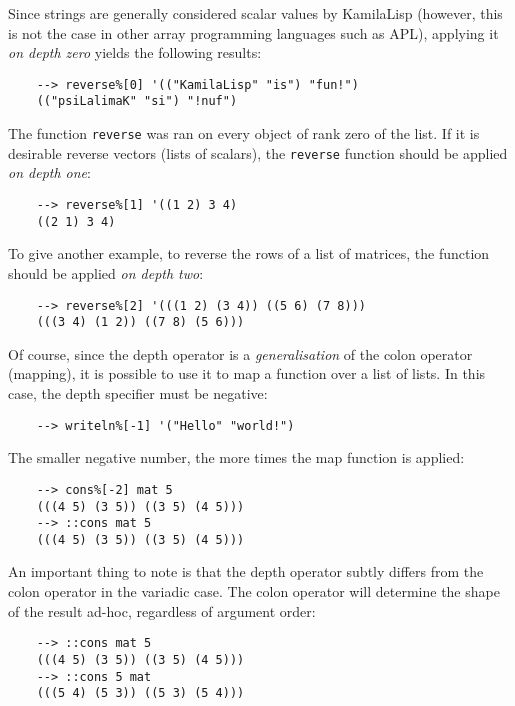Since strings are generally considered scalar values by KamilaLisp (however, this is not the case in other array programming languages such as APL), applying it \textit{on depth zero} yields the following results:

\begin{Verbatim}
    --> reverse%[0] '(("KamilaLisp" "is") "fun!")
    (("psiLalimaK" "si") "!nuf")
\end{Verbatim}

The function \verb|reverse| was ran on every object of rank zero of the list. If it is desirable reverse vectors (lists of scalars), the \verb|reverse| function should be applied \textit{on depth one}:

\begin{Verbatim}
    --> reverse%[1] '((1 2) 3 4)
    ((2 1) 3 4)
\end{Verbatim}

To give another example, to reverse the rows of a list of matrices, the function should be applied \textit{on depth two}:

\begin{Verbatim}
    --> reverse%[2] '(((1 2) (3 4)) ((5 6) (7 8)))
    (((3 4) (1 2)) ((7 8) (5 6)))
\end{Verbatim}

Of course, since the depth operator is a \textit{generalisation} of the colon operator (mapping), it is possible to use it to map a function over a list of lists. In this case, the depth specifier must be negative:

\begin{Verbatim}
    --> writeln%[-1] '("Hello" "world!")
\end{Verbatim}

The smaller negative number, the more times the map function is applied:

\begin{Verbatim}
    --> cons%[-2] mat 5
    (((4 5) (3 5)) ((3 5) (4 5)))
    --> ::cons mat 5
    (((4 5) (3 5)) ((3 5) (4 5)))
\end{Verbatim}

An important thing to note is that the depth operator subtly differs from the colon operator in the variadic case. The colon operator will determine the shape of the result ad-hoc, regardless of argument order:

\begin{Verbatim}
    --> ::cons mat 5
    (((4 5) (3 5)) ((3 5) (4 5)))
    --> ::cons 5 mat
    (((5 4) (5 3)) ((5 3) (5 4)))
\end{Verbatim}


